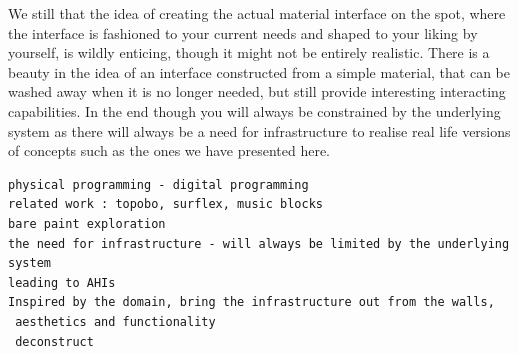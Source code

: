 
We still  that the idea of creating the actual material interface on the spot, where the interface is fashioned to your current needs and shaped to your liking by yourself, is wildly enticing, though it might not be entirely realistic.
There is a beauty in the idea of an interface constructed from a simple material, that can be washed away when it is no longer needed, but still provide interesting interacting capabilities.
In the end though you will always be constrained by the underlying system as there will always be a need for infrastructure to realise real life versions of concepts such as the ones we have presented here.

\begin{verbatim}
physical programming - digital programming
related work : topobo, surflex, music blocks
bare paint exploration
the need for infrastructure - will always be limited by the underlying system
leading to AHIs
Inspired by the domain, bring the infrastructure out from the walls,
 aesthetics and functionality
 deconstruct
\end{verbatim}